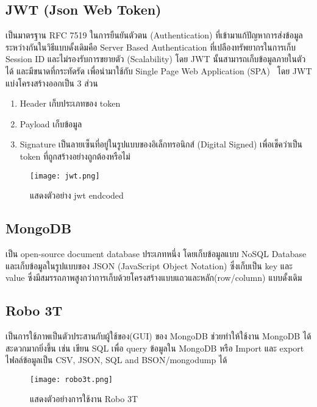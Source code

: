 \subsection{JWT (Json Web Token)}

เป็นมาตรฐาน RFC 7519 ในการยืนยันตัวตน (Authentication) ที่เข้ามาแก้ปัญหาการส่งข้อมูลระหว่างกันในวิธีแบบดั้งเดิมคือ Server Based Authentication ที่เปลืองทรัพยากรในการเก็บ Session ID และไม่รองรับการขยายตัว (Scalability)  โดย JWT นั้นสามารถเก็บข้อมูลภายในตัวได้ และมีขนาดที่กระทัดรัด เพื่อนำมาใช้กับ Single Page Web Application (SPA)~\cite{jwt} โดย JWT แบ่งโครงสร้างออกเป็น 3 ส่วน

\begin{enumerate}
  \item Header เก็บประเภทของ token
  \item Payload เก็บข้อมูล
  \item Signature เป็นลายเซ็นที่อยู่ในรูปแบบของอิเล็กทรอนิกส์ (Digital Signed) เพื่อเช็คว่าเป็น token ที่ถูกสร้างอย่างถูกต้องหรือไม่  
\end{enumerate}

\begin{figure}[H]
  \centering
  \texttt{[image: jwt.png]}
  \caption{แสดงตัวอย่าง jwt endcoded}
  \label{Fig:jwt}
\end{figure}

\subsection{MongoDB}

เป็น open-source document database ประเภทหนึ่ง โดยเก็บข้อมูลแบบ NoSQL Database และเก็บข้อมูลในรูปแบบของ JSON (JavaScript Object Notation) ซึ่งเก็บเป็น key และ value ซึ่งมีสมรรถภาพสูงกว่าการเก็บด้วยโครงสร้างแบบแถวและหลัก(row/column) แบบดั้งเดิม~\cite{mongodb}

\subsection{Robo 3T}

เป็นการใช้ภาพเป็นตัวประสานกับผู้ใช้ของ(GUI) ของ MongoDB ช่วยทำให้ใช้งาน MongoDB ได้สะดวกมากยิ่งขึ้น เช่น เขียน SQL เพื่อ query ข้อมูลใน MongoDB หรือ Import และ export ไฟลล์ข้อมูลเป็น CSV, JSON, SQL and BSON/mongodump ได้~\cite{robo3t}

\begin{figure}[H]
  \centering
  \texttt{[image: robo3t.png]}
  \caption{แสดงตัวอย่างการใช้งาน Robo 3T}
  \label{Fig:robo3t}
\end{figure}

